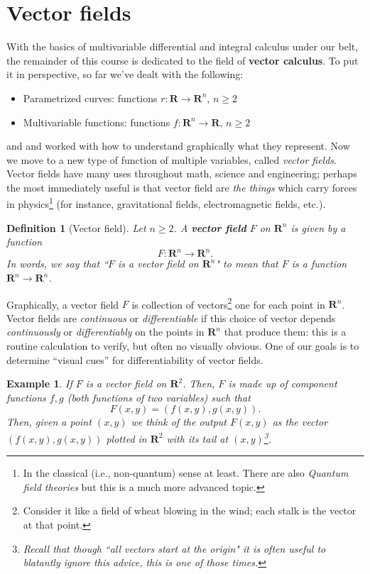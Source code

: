 \documentclass[12pt]{article}
\numberwithin{equation}{subsection}
\numberwithin{figure}{subsection}
\newtheorem{defn}[subsection]{Definition}
\theoremstyle{note}
\newtheorem{example}[subsection]{Example}
\newcommand{\R}{\mathbf{R}}
\begin{document}
{\section{Vector fields} \label{sec-vector-field}

With the basics of multivariable differential and integral calculus under our belt, the remainder of this course is dedicated to the field of \textbf{vector calculus}. To put it in perspective, so far we've dealt with the following:
\begin{itemize}
	\item Parametrized curves: functions $r\colon \mathbf{R}\to \mathbf{R}^n$, $n\geq 2$
	\item Multivariable functions: functions $f\colon \mathbf{R}^n\to \mathbf{R}$, $n\geq 2$
\end{itemize} and and worked with how to understand graphically what they represent. Now we move to a new type of function of multiple variables, called \textit{vector fields}. Vector fields have many uses throughout math, science and engineering; perhaps the most immediately useful is that vector field are \textit{the things} which carry forces in physics\footnote{In the classical (i.e., non-quantum) sense at least. There are also \textit{Quantum field theories} but this is a much more advanced topic.} (for instance, gravitational fields, electromagnetic fields, etc.).

\begin{defn}[Vector field]Let $n\geq 2$. A \textbf{vector field} $F$ on $\mathbf{R}^n$ is given by a function \[F\colon \mathbf{R}^n\to\mathbf{R}^n.\] In words, we say that ``$F$ is a vector field on $\R^n$" to mean that $F$ is a function $\R^n\to\R^n$.
\end{defn}


Graphically, a vector field $F$ is collection of vectors\footnote{Consider it like a field of wheat blowing in the wind; each stalk is the vector at that point.} one for each point in  $\mathbf{R}^n$. Vector fields are \textit{continuous} or \textit{differentiable} if this choice of vector depends \textit{continuously} or \textit{differentiably} on the points in $\mathbf{R}^n$ that produce them: this is a routine calculation to verify, but often no visually obvious. One of our goals is to determine ``visual cues'' for differentiability of vector fields. 

\begin{example} If $F$ is a vector field on $\mathbf{R}^2$. Then, $F$ is made up of \textit{component functions} $f,g$ (both functions of two variables) such that \begin{equation}F(x,y)=(f(x,y),g(x,y)).\end{equation} Then, given a point $(x,y)$ we think of the output $F(x,y)$ as the vector $(f(x,y),g(x,y))$ plotted in $\mathbf{R}^2$ with its tail at $(x,y)$\footnote{Recall that though ``all vectors start at the origin" it is often useful to blatantly ignore this advice, this is one of those times.}.


\end{example}}
\end{document}
